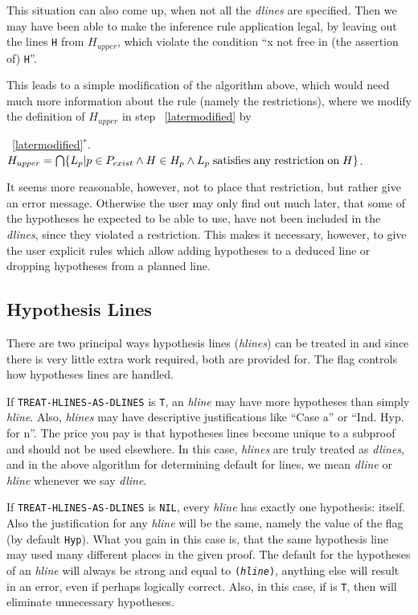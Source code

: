 This situation can also come up, when  not all the {\it dlines} are specified.
Then we may have been able to make the inference rule application legal,
by leaving out the lines {\tt H} from $H_{upper}$, which violate the condition
``x not free in (the assertion of) {\tt H}''.

This leads to a simple modification of the algorithm above, which would need
much more information about the rule (namely the restrictions), where
we modify the definition of $H_{upper}$ in step ~\ref{latermodified} by 

~\ref{latermodified}$^{*}$.
$H_{upper} = \bigcap \{L_p | p \in P_{exist} \land H\in H_p
\land L_p \;{\rm satisfies\; any\; restriction\; on\; } H\}$.

It seems more reasonable, however, not to place that restriction, but rather
give an error message.  Otherwise the user may only find out much later, that
some of the hypotheses he expected to be able to use, have not been included
in the {\it dlines}, since they violated a restriction.  This makes it necessary,
however, to give the user explicit rules which allow adding hypotheses to
a deduced line or dropping hypotheses from a planned line.

\subsection{Hypothesis Lines}

There are two principal ways hypothesis lines ({\it hlines}) can be treated
in \TPS and since there is very little extra work required, both are
provided for.  The flag  controls how hypotheses
lines are handled.

If {\tt TREAT-HLINES-AS-DLINES} is {\tt T}, an {\it hline} may have more
hypotheses than simply {\it hline}.  Also, {\it hlines} may have descriptive
justifications like ``Case {a}'' or ``Ind. Hyp. for n''.  The price you
pay is that hypotheses lines become unique to a subproof and should not
be used elsewhere.  In this case, {\it hlines} are truly treated as
{\it dlines}, and in the above algorithm for determining default for
lines, we mean {\it dline} or {\it hline} whenever we say {\it dline}.

If {\tt TREAT-HLINES-AS-DLINES} is {\tt NIL}, every {\it hline} has exactly
one hypothesis: itself.  Also the justification for any {\it hline} will
be the same, namely the value of the flag 
(by default {\tt Hyp}).  What you gain in this case is, that the same
hypothesis line may used many different places in the given proof.  The
default for the hypotheses of an {\it hline} will always be strong and
equal to {\tt ({\it hline})}, anything else will result in an error, even if
perhaps logically correct. Also, in this case, 
if  is {\tt T}, then  will
eliminate unnecessary hypotheses.

